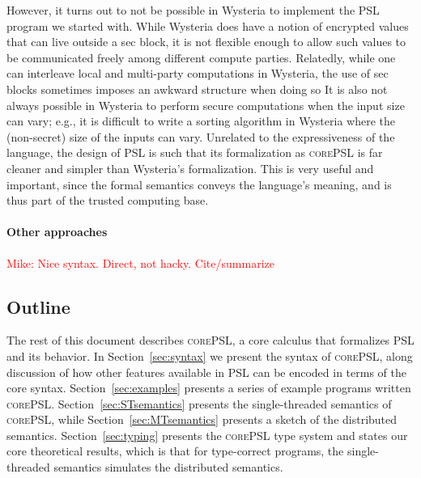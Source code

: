 \documentclass[10pt]{article}
\newcommand{\lang}{\textsc{corePSL}\xspace}
\newcommand{\mwh}[1]{\textcolor{red}{Mike: #1}}
\begin{document}
However, it turns out to not be possible in Wysteria to implement the
PSL program we started with. While Wysteria does have a notion of
encrypted values that can live outside a sec block, it is not flexible
enough to allow such values to be communicated freely among different
compute parties. Relatedly, while one can interleave local and
multi-party computations in Wysteria, the use of sec blocks sometimes
imposes an awkward structure when doing so It is also not always
possible in Wysteria to perform secure computations when the input
size can vary; e.g., it is difficult to write a sorting algorithm in
Wysteria where the (non-secret) size of the inputs can vary. Unrelated
to the expressiveness of the language, the design of PSL is such that
its formalization as \lang is far cleaner and simpler than Wysteria's
formalization. This is very useful and important, since the
formal semantics conveys the language's meaning, and is thus part of
the trusted computing base.

\paragraph{Other approaches}

\mwh{Nice syntax. Direct, not hacky. Cite/summarize}

\subsection{Outline}

The rest of this document describes \lang, a core calculus that
formalizes PSL and its behavior. In Section~\ref{sec:syntax} we
present the syntax of \lang, along discussion of how other features
available in PSL can be encoded in terms of the core
syntax. Section~\ref{sec:examples} presents a series of example
programs written \lang. Section~\ref{sec:STsemantics} presents the
single-threaded semantics of \lang, while
Section~\ref{sec:MTsemantics} presents a sketch of the distributed
semantics. Section~\ref{sec:typing} presents the \lang type system and
states our core theoretical results, which is that for type-correct
programs, the single-threaded semantics simulates the distributed
semantics.
\end{document}
